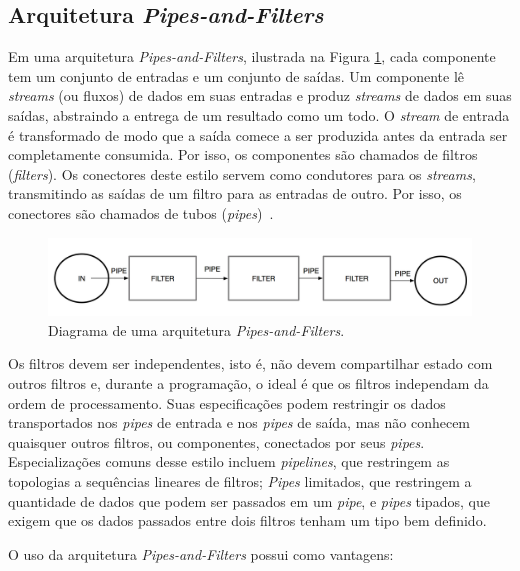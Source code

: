 \documentclass[Portugues,Final]{ic-tese-v3}
\begin{document}
\subsection{Arquitetura \textit{Pipes-and-Filters}}

Em uma arquitetura \textit{Pipes-and-Filters}, ilustrada na Figura \ref{fig:PipeandFilter}, cada componente tem um conjunto de entradas e um conjunto de saídas. Um componente lê \textit{streams} (ou fluxos) de dados em suas entradas e produz \textit{streams} de dados em suas saídas, abstraindo a entrega de um resultado como um todo. O \textit{stream} de entrada é transformado de modo que a saída comece a ser produzida antes da entrada ser completamente consumida. Por isso, os componentes são chamados de filtros (\textit{filters}). Os conectores deste estilo servem como condutores para os \textit{streams}, transmitindo as saídas de um filtro para as entradas de outro. Por isso, os conectores são chamados de tubos (\textit{pipes})~\cite{Garlan_1993}.

\begin{figure}[h]
\centering
\includegraphics[scale=0.25]{images/PipeandFilter.png}
\caption {Diagrama de uma arquitetura \textit{Pipes-and-Filters}.}
\label{fig:PipeandFilter}
\end{figure}

Os filtros devem ser independentes, isto é, não devem compartilhar estado com outros filtros e, durante a programação, o ideal é que os filtros independam da ordem de processamento. Suas especificações podem restringir os dados transportados nos \textit{pipes} de entrada e nos \textit{pipes} de saída, mas não conhecem quaisquer outros filtros, ou componentes, conectados por seus \textit{pipes}. Especializações comuns desse estilo incluem \textit{pipelines}, que restringem as topologias a sequências lineares de filtros; \textit{Pipes} limitados, que restringem a quantidade de dados que podem ser passados em um \textit{pipe}, e \textit{pipes} tipados, que exigem que os dados passados entre dois filtros tenham um tipo bem definido.

O uso da arquitetura \textit{Pipes-and-Filters} possui como vantagens:
\end{document}
